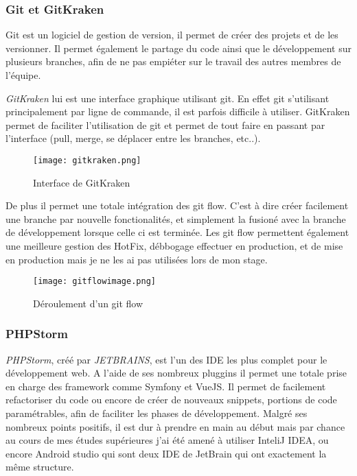 \subsubsection{Git et GitKraken}
Git est un logiciel de gestion de version, il permet de créer des projets et de les versionner. Il permet également le partage du code ainsi que le développement sur plusieurs branches, afin de ne pas empiéter sur le travail des autres membres de l'équipe.

\textit{GitKraken}\cite{gitkraken} lui est une interface graphique utilisant git. En effet git s'utilisant principalement par ligne de commande, il est parfois difficile à utiliser. GitKraken permet de faciliter l'utilisation de git et permet de tout faire en passant par l'interface (pull, merge, se déplacer entre les branches, etc..).

\begin{figure}[htbp]
    \center
    \texttt{[image: gitkraken.png]}
    \caption{Interface de  GitKraken}
\end{figure}

De plus il permet une totale intégration des git flow. C'est à dire créer facilement une branche par nouvelle fonctionalités, et simplement la fusioné avec la branche de développement lorsque celle ci est terminée.
Les git flow permettent également une meilleure gestion des HotFix, débbogage effectuer en production, et de mise en production mais je ne les ai pas utilisées lors de mon stage. 

\begin{figure}[htbp]
    \center
\texttt{[image: gitflowimage.png]}
\caption{Déroulement d'un git flow}
\end{figure}


\subsubsection{PHPStorm}

\textit{PHPStorm}\cite{phpstorm}, créé par \textit{JETBRAINS}\cite{jetbrains}, est l'un des IDE les plus complet pour le développement web.
A l'aide de ses nombreux pluggins il permet une totale prise en charge des framework comme Symfony\cite{symfony} et VueJS\cite{vue}. Il permet de facilement refactoriser du code  ou encore de créer de nouveaux snippets, portions de code paramétrables, afin de faciliter les phases de développement.
Malgré ses nombreux points positifs, il est dur à prendre en main au début mais par chance au cours de mes études supérieures j'ai été amené à utiliser InteliJ IDEA\cite{idea}, ou encore Android studio\cite{androidstudio} qui sont deux IDE de JetBrain qui ont exactement la même structure. 

